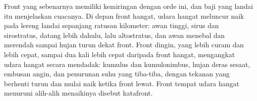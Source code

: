 Front yang sebenarnya memiliki kemiringan dengan orde ini, dan baji yang landai itu menjelaskan cuacanya. Di depan
front hangat, udara hangat meluncur naik pada lereng landai sepanjang ratusan kilometer: awan tinggi,
sirus dan sirostratus, datang lebih dahulu, lalu altostratus, dan awan menebal dan merendah sampai
hujan turun dekat front. Front dingin, yang lebih curam dan lebih cepat, sampai dua kali lebih cepat daripada front
hangat, mengangkat udara hangat secara mendadak: kumulus dan kumulonimbus, hujan deras sesaat, embusan angin, dan penurunan
suhu yang tiba-tiba, dengan tekanan yang berhenti turun dan mulai naik ketika front lewat. Front
tempat udara hangat menuruni  alih-alih menaikinya disebut katafront.

